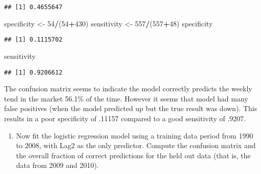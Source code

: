 \documentclass[]{article}
\newenvironment{Shaded}{\begin{snugshade}}{\end{snugshade}}
\newcommand{\DecValTok}[1]{\textcolor[rgb]{0.00,0.00,0.81}{#1}}
\newcommand{\NormalTok}[1]{#1}
\newcommand{\OperatorTok}[1]{\textcolor[rgb]{0.81,0.36,0.00}{\textbf{#1}}}
\newcommand{\StringTok}[1]{\textcolor[rgb]{0.31,0.60,0.02}{#1}}
\providecommand{\tightlist}{%
  \setlength{\itemsep}{0pt}\setlength{\parskip}{0pt}}
\begin{document}
\begin{verbatim}
## [1] 0.4655647
\end{verbatim}

\begin{Shaded}
\begin{Highlighting}[]
\NormalTok{specificity <-}\StringTok{ }\DecValTok{54}\OperatorTok{/}\NormalTok{(}\DecValTok{54}\OperatorTok{+}\DecValTok{430}\NormalTok{)}
\NormalTok{sensitivity <-}\StringTok{ }\DecValTok{557}\OperatorTok{/}\NormalTok{(}\DecValTok{557}\OperatorTok{+}\DecValTok{48}\NormalTok{)}
\NormalTok{specificity}
\end{Highlighting}
\end{Shaded}

\begin{verbatim}
## [1] 0.1115702
\end{verbatim}

\begin{Shaded}
\begin{Highlighting}[]
\NormalTok{sensitivity}
\end{Highlighting}
\end{Shaded}

\begin{verbatim}
## [1] 0.9206612
\end{verbatim}

The confusion matrix seems to indicate the model correctly predicts the
weekly tend in the market 56.1\% of the time. However it seems that
model had many false positives (when the model predicted up but the true
result was down). This results in a poor specificity of .11157 compared
to a good sensitivity of .9207.

\begin{enumerate}
\def\labelenumi{(\alph{enumi})}
\setcounter{enumi}{3}
\tightlist
\item
  Now fit the logistic regression model using a training data period
  from 1990 to 2008, with Lag2 as the only predictor. Compute the
  confusion matrix and the overall fraction of correct predictions for
  the held out data (that is, the data from 2009 and 2010).
\end{enumerate}
\end{document}

